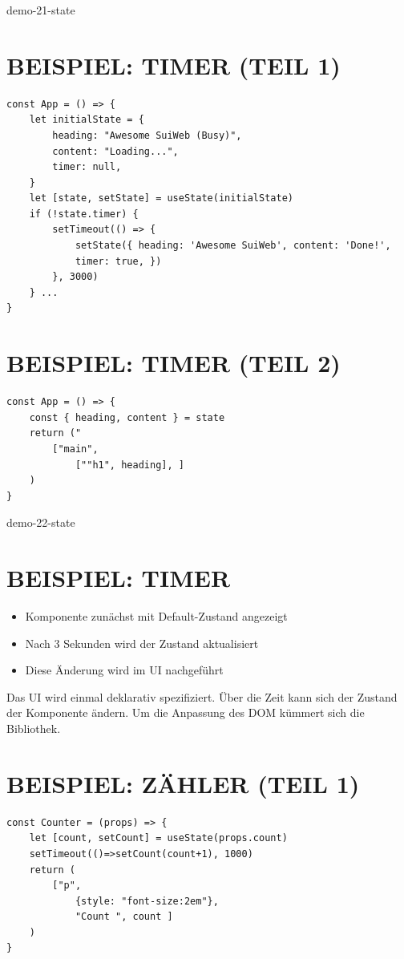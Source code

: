 \documentclass[10pt]{article}
\begin{document}
demo-21-state

\section*{BEISPIEL: TIMER (TEIL 1)}
\begin{verbatim}
const App = () => {
    let initialState = {
        heading: "Awesome SuiWeb (Busy)",
        content: "Loading...",
        timer: null,
    }
    let [state, setState] = useState(initialState)
    if (!state.timer) {
        setTimeout(() => {
            setState({ heading: 'Awesome SuiWeb', content: 'Done!',
            timer: true, })
        }, 3000)
    } ...
}
\end{verbatim}

\section*{BEISPIEL: TIMER (TEIL 2)}
\begin{verbatim}
const App = () => {
    const { heading, content } = state
    return ("
        ["main",
            [""h1", heading], ]
    )
}
\end{verbatim}

demo-22-state

\section*{BEISPIEL: TIMER}
\begin{itemize}
  \item Komponente zunächst mit Default-Zustand angezeigt
  \item Nach 3 Sekunden wird der Zustand aktualisiert
  \item Diese Änderung wird im UI nachgeführt
\end{itemize}

Das UI wird einmal deklarativ spezifiziert. Über die Zeit kann sich der Zustand der Komponente ändern. Um die Anpassung des DOM kümmert sich die Bibliothek.

\section*{BEISPIEL: ZÄHLER (TEIL 1)}
\begin{verbatim}
const Counter = (props) => {
    let [count, setCount] = useState(props.count)
    setTimeout(()=>setCount(count+1), 1000)
    return (
        ["p",
            {style: "font-size:2em"},
            "Count ", count ]
    )
}
\end{verbatim}
\end{document}

